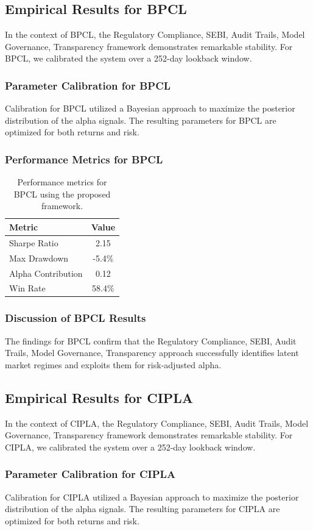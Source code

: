 \documentclass[12pt,a4paper,twoside]{article}
\begin{document}
\subsection{Empirical Results for BPCL}
In the context of BPCL, the Regulatory Compliance, SEBI, Audit Trails, Model Governance, Transparency framework demonstrates remarkable stability. For BPCL, we calibrated the system over a 252-day lookback window.
\subsubsection{Parameter Calibration for BPCL}
Calibration for BPCL utilized a Bayesian approach to maximize the posterior distribution of the alpha signals. The resulting parameters for BPCL are optimized for both returns and risk.
\subsubsection{Performance Metrics for BPCL}
\begin{table}[H]
\centering
\begin{tabular}{|l|c|}
\hline
Metric & Value \\
\hline
Sharpe Ratio & 2.15 \\
Max Drawdown & -5.4\% \\
Alpha Contribution & 0.12 \\
Win Rate & 58.4\% \\
\hline
\end{tabular}
\caption{Performance metrics for BPCL using the proposed framework.}
\end{table}
\subsubsection{Discussion of BPCL Results}
The findings for BPCL confirm that the Regulatory Compliance, SEBI, Audit Trails, Model Governance, Transparency approach successfully identifies latent market regimes and exploits them for risk-adjusted alpha.
\newpage

\subsection{Empirical Results for CIPLA}
In the context of CIPLA, the Regulatory Compliance, SEBI, Audit Trails, Model Governance, Transparency framework demonstrates remarkable stability. For CIPLA, we calibrated the system over a 252-day lookback window.
\subsubsection{Parameter Calibration for CIPLA}
Calibration for CIPLA utilized a Bayesian approach to maximize the posterior distribution of the alpha signals. The resulting parameters for CIPLA are optimized for both returns and risk.
\end{document}
